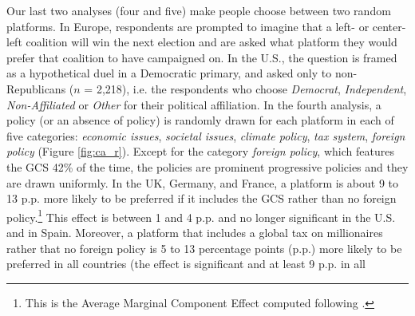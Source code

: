 Our last two analyses (four and five) make people choose between two random platforms. In Europe, respondents are prompted to imagine that a left- or center-left coalition will win the next election and are asked what platform they would prefer that coalition to have campaigned on. In the U.S., the question is framed as a hypothetical duel in a Democratic primary, and asked only to non-Republicans ($n$ = 2,218), i.e. the respondents who choose \textit{Democrat}, \textit{Independent}, \textit{Non-Affiliated} or \textit{Other} for their political affiliation. In the fourth analysis, a policy (or an absence of policy) is randomly drawn for each platform in each of five categories: \textit{economic issues}, \textit{societal issues}, \textit{climate policy}, \textit{tax system}, \textit{foreign policy} (Figure \ref{fig:ca_r}). 
Except for the category \textit{foreign policy}, which features the GCS 42\% of the time, the policies are prominent progressive policies and they are drawn uniformly. %
In the UK, Germany, and France, a platform is about 9 to 13 p.p. more likely to be preferred if it includes the GCS rather than no foreign policy.\footnote{This is the Average Marginal Component Effect computed following \citet{hainmueller_causal_2014}.} This effect is between 1 and 4 p.p. and no longer significant in the U.S. and in Spain. Moreover, a platform that includes a global tax on millionaires rather that no foreign policy is 5 to 13 percentage points (p.p.) more likely to be preferred in all countries (the effect is significant and at least 9 p.p. in all 


